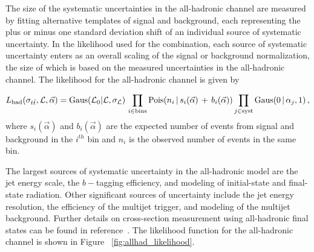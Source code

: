 The size of the systematic uncertainties in the all-hadronic channel are measured by fitting alternative templates of signal and background, 
each representing the plus or minus one standard deviation shift of an individual source of systematic uncertainty.
In the likelihood used for the combination, each source of systematic uncertainty enters as an overall scaling of the signal or background normalization,
the size of which is based on the measured uncertainties in the all-hadronic channel.
The likelihood for the all-hadronic channel is given by

\begin{equation}\label{Eq:dileplikelihood}
  L_{\text{had}}(\sigma_{t\bar{t}}, {\cal L}, \vec{\alpha }) = \text{Gaus}({\cal L}_0 | {\cal L}, \sigma_{\cal L})\, \prod_{i\in \text{bins}} \text{Pois}(n_{i} \,|\, s_{i}(\vec{\alpha}) \,+\, b_{i}(\vec{\alpha}))  \prod_{j\in \text{syst}} \text{Gaus}( 0 \,|\, \alpha_{j}, 1) \,  ,
\end{equation}
where $s_{i}(\vec{\alpha})$ and $b_{i}(\vec{\alpha})$ are the expected number of events from signal and background in the $i^{th}$ bin and $n_{i}$ is the observed number of events in the same bin. 

The largest sources of systematic uncertainty in the all-hadronic model are the jet energy scale, the $b-$tagging efficiency, and modeling of initial-state and final-state radiation.
Other significant sources of uncertainty include the jet energy resolution, the efficiency of the multijet trigger, and modeling of the multijet background.
Further details on cross-section measurement using all-hadronic final states can be found in reference~\cite{ATLAS-CONF-2011-140}.
The likelihood function for the all-hadronic channel is shown in Figure ~\ref{fig:allhad_likelihood}.

